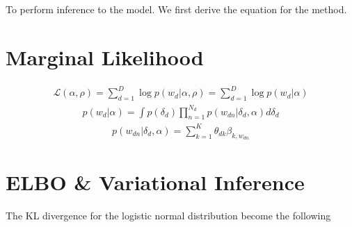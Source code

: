To perform inference to the model. We first derive the equation for the method.
\section{Marginal Likelihood}
\begin{align*}
\mathcal{L}(\alpha,\rho)=\sum_{d=1}^{D}\log p(w_d|\alpha,\rho)=\sum_{d=1}^{D}\log p(w_d|\alpha)
\end{align*}
\begin{align*}
p(w_d|\alpha)=\int p(\delta_d)\prod_{n=1}^{N_d}p(w_{dn}|\delta_d,\alpha)d\delta_d
\end{align*}
\begin{align*}
p(w_{dn}|\delta_d,\alpha)=\sum_{k=1}^{K}\theta_{dk}\beta_{k,w_{dn}}
\end{align*}
\section{ELBO \& Variational Inference}
The KL divergence for the logistic normal distribution become the following
